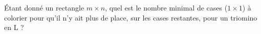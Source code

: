 Étant donné un rectangle $m \times n$, quel est le nombre minimal de cases ($1 \times 1$) à colorier pour qu'il n'y ait plus de place, sur les cases restantes, pour un triomino en L ?
